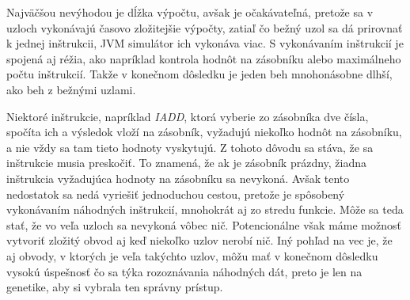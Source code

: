 Najväčšou nevýhodou je dĺžka výpočtu, avšak je očakávateľná, pretože sa v uzloch vykonávajú časovo zložitejšie výpočty, zatiaľ čo bežný uzol sa dá prirovnať k jednej inštrukcii, JVM simulátor ich vykonáva viac. S vykonávaním inštrukcií je spojená aj réžia, ako napríklad kontrola hodnôt na zásobníku alebo maximálneho počtu inštrukcií. Takže v konečnom dôsledku je jeden beh mnohonásobne dlhší, ako beh z bežnými uzlami.

Niektoré inštrukcie, napríklad \textit{IADD}, ktorá vyberie zo zásobníka dve čísla, spočíta ich a výsledok vloží na zásobník, vyžadujú niekoľko hodnôt na zásobníku, a nie vždy sa tam tieto hodnoty vyskytujú. Z tohoto dôvodu sa stáva, že sa inštrukcie musia preskočiť. To znamená, že ak je zásobník prázdny, žiadna inštrukcia vyžadujúca hodnoty na zásobníku sa nevykoná. Avšak tento nedostatok sa nedá vyriešiť jednoduchou cestou, pretože je spôsobený vykonávaním náhodných inštrukcií, mnohokrát aj zo stredu funkcie. Môže sa teda stať, že vo veľa uzloch sa nevykoná vôbec nič. Potencionálne však máme možnosť vytvoriť zložitý obvod aj keď niekoľko uzlov nerobí nič. Iný pohľad na vec je, že aj obvody, v ktorých je veľa takýchto uzlov, môžu mať v konečnom dôsledku vysokú úspešnosť čo sa týka rozoznávania náhodných dát, preto je len na genetike, aby si vybrala ten správny prístup. 
